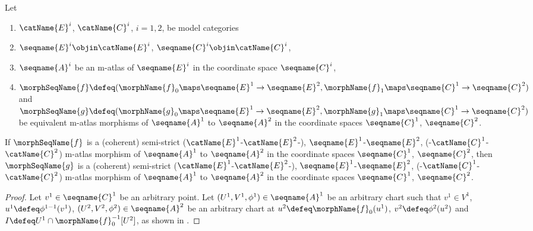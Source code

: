 \documentclass{article}
\begin{document}
\begin{lemma}
\label{lem:M-ATLmorphequiv}
Let
\begin{enumerate}
\item
$\catName{E}^i$, $\catName{C}^i$, $i=1,2$, be model categories
\item
$\seqname{E}^i \objin \catName{E}^i$,
$\seqname{C}^i \objin \catName{C}^i$,
\item
$\seqname{A}^i$ be an m-atlas of
$\seqname{E}^i$ in the coordinate space $\seqname{C}^i$,
\item
$
  \morphSeqName{f} \defeq
  (
    \morphName{f}_0 \maps \seqname{E}^1 \to \seqname{E}^2,
    \morphName{f}_1 \maps \seqname{C}^1 \to \seqname{C}^2
  )
$ and
$
  \morphSeqName{g} \defeq
  (
    \morphName{g}_0 \maps \seqname{E}^1 \to \seqname{E}^2,
    \morphName{g}_1 \maps \seqname{C}^1 \to \seqname{C}^2
  )
$
be equivalent m-atlas morphisms of $\seqname{A}^1$ to
$\seqname{A}^2$ in the coordinate spaces $\seqname{C}^1$,
$\seqname{C}^2$.
\end{enumerate}

If $\morphSeqName{f}$ is a (coherent) semi-strict
\nobreaks
  {
    {($\catName{E}^1$-$\catName{E}^2$-)},
    {$\seqname{E}^1$-$\seqname{E}^2$},
    {(-$\catName{C}^1$-$\catName{C}^2$)}
  }
m-atlas morphism of $\seqname{A}^1$ to $\seqname{A}^2$ in the
coordinate spaces $\seqname{C}^1$, $\seqname{C}^2$, then
$\morphSeqName{g}$ is a (coherent) semi-strict
\nobreaks
  {
    {($\catName{E}^1$-$\catName{E}^2$-)},
    {$\seqname{E}^1$-$\seqname{E}^2$},
    {(-$\catName{C}^1$-$\catName{C}^2$)}
  }
m-atlas morphism of $\seqname{A}^1$ to $\seqname{A}^2$ in the
coordinate spaces $\seqname{C}^1$, $\seqname{C}^2$.

\begin{proof}
Let $v^1 \in \seqname{C}^1$ be an arbitrary point. Let
$(U^1,V^1,\phi^1) \in \seqname{A}^1$ be an arbitrary chart such that
$v^1 \in V^1$, $u^1 \defeq \phi^{1-1}(v^1)$,
$(U^2,V^2,\phi^2) \in \seqname{A}^2$ be an arbitrary chart at
$u^2 \defeq \morphName{f}_0(u^1)$, $v^2 \defeq \phi^2(u^2)$ and
$I \defeq U^1 \cap \morphName{f}_0^{-1}[U^2]$, as shown in
.


\end{proof}
\end{lemma}
\end{document}
